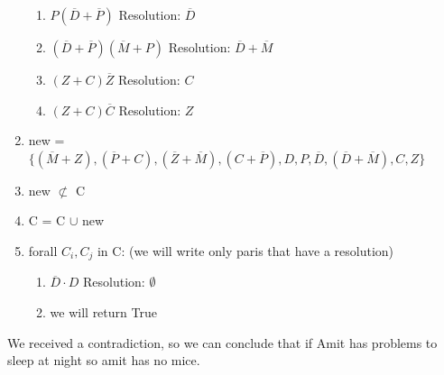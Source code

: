\documentclass{article}
\begin{document}
\begin{enumerate}
\begin{enumerate}
        \item $P(\overline D + \overline P)$ Resolution: $\overline D$
        \item $(\overline D + \overline P)(\overline M + P)$ Resolution: $\overline D + \overline M $
        \item $(Z+C)\overline Z$ Resolution: $C$
        \item $(Z+C)\overline C$ Resolution: $Z$
    \end{enumerate}
    \item new = $\{(\overline M + Z), (\overline P + C), (\overline Z + \overline M), (C + \overline P), D, P, \overline D, (\overline D + \overline M), C, Z\}$
    \item new $\not\subset$ C
    \item C = C $\cup$ new 
    \item forall $C_i, C_j$ in C: (we will write only paris that have a resolution)
    \begin{enumerate}
        \item $\overline D \cdot D$ Resolution: $\emptyset$
        \item we will return True
    \end{enumerate}
\end{enumerate}
We received a contradiction, so we can conclude that if Amit has problems to sleep at night so amit has no mice.
\end{document}
